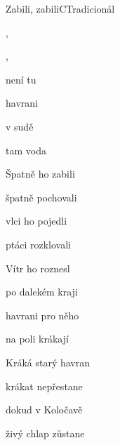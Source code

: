 \setcounter{page}{100}
\begin{song}{Zabili, zabili}{C}{Tradicionál}

\begin{SBVerse}

, 

 

, 

 

\end{SBVerse}

\begin{SBChorus}

není tu

havrani 

 v sudě

 tam voda 

  

\end{SBChorus}

\begin{SBVerse}

Špatně ho zabili

špatně pochovali

vlci ho pojedli

ptáci rozklovali

\end{SBVerse}

\begin{SBChorus}

\end{SBChorus}

\begin{SBVerse}

Vítr ho roznesl

po dalekém kraji

havrani pro něho

na poli krákají

\end{SBVerse}

\begin{SBChorus}

\end{SBChorus}

\begin{SBVerse}

Kráká starý havran

krákat nepřestane

dokud v Koločavě

živý chlap zůstane

\end{SBVerse}

\begin{SBChorus}

\end{SBChorus}

\end{song}

\clearpage
